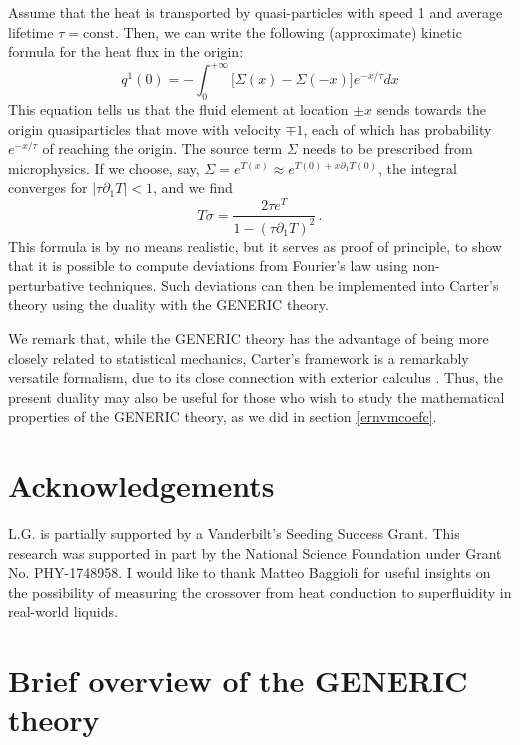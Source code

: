 \documentclass[a4paper, amsfonts, amssymb, amsmath, reprint, showkeys, nofootinbib, twoside, onecolumn, notitlepage]{revtex4-1}
\begin{document}
Assume that the heat is transported by quasi-particles with speed 1 and average lifetime $\tau=\text{const}$. Then, we can write the following (approximate) kinetic formula for the heat flux in the origin:
\begin{equation}
    q^1(0)= -\int_0^{+\infty} \big[\Sigma(x)-\Sigma(-x) \big]e^{-x/\tau} dx
\end{equation}
This equation tells us that the fluid element at location $\pm x$ sends towards the origin quasiparticles that move with velocity $\mp 1$, each of which has probability $e^{-x/\tau}$ of reaching the origin. The source term $\Sigma$ needs to be prescribed from microphysics. If we choose, say, $\Sigma=e^{T(x)} \approx e^{T(0)+x\partial_1T(0)}$, the integral converges for $|\tau \partial_1 T|<1$, and we find
\begin{equation}
    T\sigma = \dfrac{2\tau e^T}{1-(\tau \partial_1 T)^2} \, .
\end{equation}
This formula is by no means realistic, but it serves as proof of principle, to show that it is possible to compute deviations from Fourier's law using non-perturbative techniques. Such deviations can then be implemented into Carter's theory using the duality with the GENERIC theory.

We remark that, while the GENERIC theory has the advantage of being more closely related to statistical mechanics, Carter's framework is a remarkably versatile formalism, due to its close connection with exterior calculus \cite{Prix_single_vortex,Carter_Prix_Magnus,Carter_defects2000,langlois98}. Thus, the present duality may also be useful for those who wish to study the mathematical properties of the GENERIC theory, as we did in section \ref{ernvmcoefc}.


\section*{Acknowledgements}

L.G. is partially supported by a Vanderbilt's Seeding Success Grant. This research was supported in part by the National Science Foundation under Grant No. PHY-1748958. I would like to thank Matteo Baggioli for useful insights on the possibility of measuring the crossover from heat conduction to superfluidity in real-world liquids.
\appendix

\section{Brief overview of the GENERIC theory}\label{appenDonae}
\end{document}
